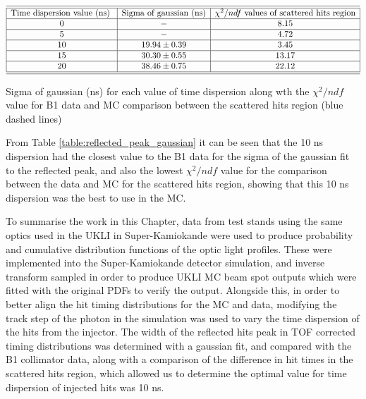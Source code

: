 \begin{table}[htp]
$$
\begin{array}{|c|c|c|}  
    \hline \hline{\text {Time dispersion value (ns) }} & {\text {Sigma of gaussian (ns)}} & {\text {$\chi^{2}/ndf$ values of scattered hits region}}  \tabularnewline
    \hline \text { 0 } & - & 8.15 \\
    \hline \text { 5 } & - & 4.72 \\
    \hline \text { 10 } & 19.94 \pm 0.39 & 3.45 \\
    \hline \text { 15 } & 30.30 \pm 0.55 & 13.17 \\
    \hline \text { 20 } & 38.46 \pm 0.75 & 22.12 \\
    \hline \hline 
\end{array}
 $$   
\caption{Sigma of gaussian (ns) for each value of time dispersion along wth the $\chi^2/ndf$ value for B1 data and MC comparison between the scattered hits region (blue dashed lines)} 
\label{table:reflected_peak_gaussian}
\end{table}

From Table \ref{table:reflected_peak_gaussian} it can be seen that the 10 ns dispersion had the closest value to the B1 data for the sigma of the gaussian fit to the reflected peak, and also the lowest $\chi^2/ndf$ value for the comparison between the data and MC for the scattered hits region, showing that this 10 ns dispersion was the best to use in the MC. 

To summarise the work in this Chapter, data from test stands using the same optics used in the UKLI in Super-Kamiokande were used to produce probability and cumulative distribution functions of the optic light profiles. These were implemented into the Super-Kamiokande detector simulation, and inverse transform sampled in order to produce UKLI MC beam spot outputs which were fitted with the original PDFs to verify the output. Alongside this, in order to better align the hit timing distributions for the MC and data, modifying the track step of the photon in the simulation was used to vary the time dispersion of the hits from the injector. The width of the reflected hits peak in TOF corrected timing distributions was determined with a gaussian fit, and compared with the B1 collimator data, along with a comparison of the difference in hit times in the scattered hits region, which allowed us to determine the optimal value for time dispersion of injected hits was 10 ns.
